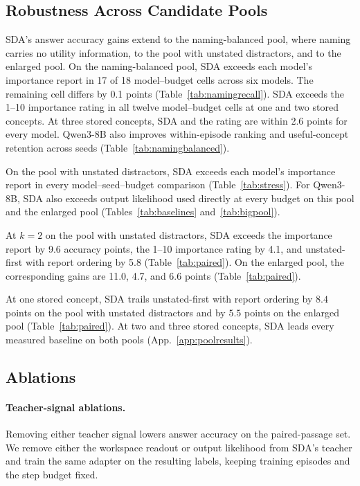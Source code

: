 

\subsection{Robustness Across Candidate Pools}
\label{sec:budgets}

SDA's answer accuracy gains extend to the naming-balanced pool, where
naming carries no utility information, to the pool with unstated
distractors, and to the enlarged pool.
On the naming-balanced pool, SDA exceeds each model's importance
report in 17 of 18 model--budget cells across six models.
The remaining cell differs by 0.1 points
(Table~\ref{tab:namingrecall}). SDA exceeds the 1--10 importance rating
in all twelve model--budget cells at one and two stored concepts.
At three stored concepts, SDA and the rating are within 2.6 points
for every model. Qwen3-8B also improves within-episode ranking and
useful-concept retention across seeds
(Table~\ref{tab:namingbalanced}).

On the pool with unstated distractors, SDA exceeds each model's
importance report in every model--seed--budget comparison
(Table~\ref{tab:stress}). For Qwen3-8B, SDA also exceeds output
likelihood used directly at every budget on this pool and the
enlarged pool (Tables~\ref{tab:baselines} and~\ref{tab:bigpool}).

At $k=2$ on the pool with unstated distractors, SDA exceeds the
importance report by 9.6 accuracy points, the 1--10 importance rating
by 4.1, and unstated-first with report ordering by 5.8
(Table~\ref{tab:paired}). On the enlarged pool, the corresponding
gains are 11.0, 4.7, and 6.6 points (Table~\ref{tab:paired}).

At one stored concept, SDA trails unstated-first with report ordering
by $8.4$ points on the pool with unstated distractors and by $5.5$
points on the enlarged pool (Table~\ref{tab:paired}). At two and three
stored concepts, SDA leads every measured baseline on both pools
(App.~\ref{app:poolresults}).

\subsection{Ablations}
\label{sec:ablations}
\label{sec:scale}

\paragraph{Teacher-signal ablations.}
Removing either teacher signal lowers answer accuracy on the
paired-passage set. We remove either the workspace readout or output
likelihood from SDA's teacher and train the same adapter on the
resulting labels, keeping training episodes and the step budget fixed.

